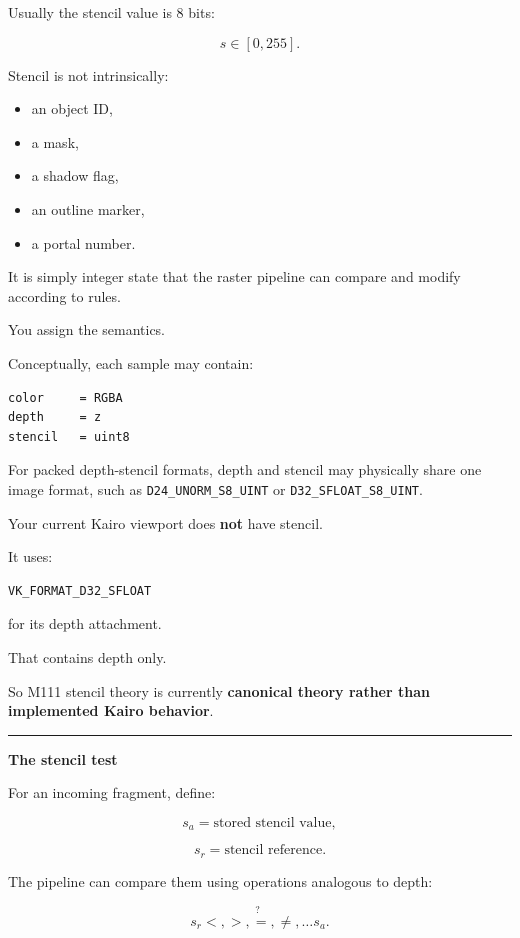 Usually the stencil value is 8 bits:

\[
s\in[0,255].
\]

Stencil is not intrinsically:

\begin{itemize}
\tightlist
\item
  an object ID,
\item
  a mask,
\item
  a shadow flag,
\item
  an outline marker,
\item
  a portal number.
\end{itemize}

It is simply integer state that the raster pipeline can compare and modify according to rules.

You assign the semantics.

Conceptually, each sample may contain:

\begin{verbatim}
color     = RGBA
depth     = z
stencil   = uint8
\end{verbatim}

For packed depth-stencil formats, depth and stencil may physically share one image format, such as \texttt{D24\_UNORM\_S8\_UINT} or \texttt{D32\_SFLOAT\_S8\_UINT}.

Your current Kairo viewport does \textbf{not} have stencil.

It uses:

\begin{verbatim}
VK_FORMAT_D32_SFLOAT
\end{verbatim}

for its depth attachment.

That contains depth only.

So M111 stencil theory is currently \textbf{canonical theory rather than implemented Kairo behavior}.

\begin{center}\rule{0.5\linewidth}{0.5pt}\end{center}

\textbf{The stencil test}

For an incoming fragment, define:

\[
s_a = \text{stored stencil value},
\]

\[
s_r = \text{stencil reference}.
\]

The pipeline can compare them using operations analogous to depth:

\[
s_r \stackrel{?}{<,>,=,\neq,\dots} s_a.
\]

